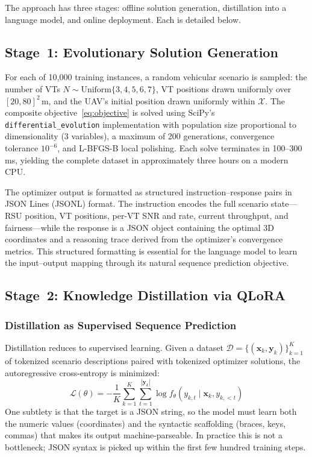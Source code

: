 \documentclass[journal]{IEEEtran}
\begin{document}
The approach has three stages: offline solution generation, distillation into a language model, and online deployment. Each is detailed below.

\subsection{Stage~1: Evolutionary Solution Generation}

For each of 10{,}000 training instances, a random vehicular scenario is sampled: the number of VTs $N \sim \text{Uniform}\{3,4,5,6,7\}$, VT positions drawn uniformly over $[20,80]^2$\,m, and the UAV's initial position drawn uniformly within $\mathcal{X}$. The composite objective~\eqref{eq:objective} is solved using SciPy's \texttt{differential\_evolution} implementation \cite{storn1997} with population size proportional to dimensionality (3 variables), a maximum of 200 generations, convergence tolerance $10^{-6}$, and L-BFGS-B local polishing. Each solve terminates in 100--300\,ms, yielding the complete dataset in approximately three hours on a modern CPU.

The optimizer output is formatted as structured instruction--response pairs in JSON Lines (JSONL) format. The instruction encodes the full scenario state---RSU position, VT positions, per-VT SNR and rate, current throughput, and fairness---while the response is a JSON object containing the optimal 3D coordinates and a reasoning trace derived from the optimizer's convergence metrics. This structured formatting is essential for the language model to learn the input--output mapping through its natural sequence prediction objective.

\subsection{Stage~2: Knowledge Distillation via QLoRA}

\subsubsection{Distillation as Supervised Sequence Prediction}

Distillation reduces to supervised learning. Given a dataset $\mathcal{D} = \{(\mathbf{x}_k, \mathbf{y}_k)\}_{k=1}^{K}$ of tokenized scenario descriptions paired with tokenized optimizer solutions, the autoregressive cross-entropy is minimized:
\begin{equation}
    \mathcal{L}(\theta) = -\frac{1}{K}\sum_{k=1}^{K} \sum_{t=1}^{|\mathbf{y}_k|} \log f_\theta(y_{k,t} \mid \mathbf{x}_k, y_{k,<t})
    \label{eq:loss}
\end{equation}
One subtlety is that the target is a JSON string, so the model must learn both the numeric values (coordinates) and the syntactic scaffolding (braces, keys, commas) that makes its output machine-parseable. In practice this is not a bottleneck; JSON syntax is picked up within the first few hundred training steps.
\end{document}
